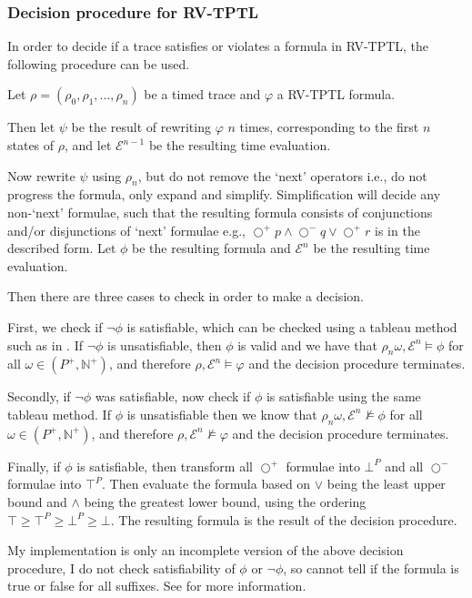 \documentclass[a4paper]{article}
\newcommand{\sn}{\bigcirc^+}
\newcommand{\wn}{\bigcirc^-}
\newcommand{\eval}{\mathcal{E}}
\begin{document}
\subsubsection{Decision procedure for RV-TPTL}
In order to decide if a trace satisfies or violates a formula in RV-TPTL, the following procedure can be used.

\begin{desc}[RV-TPTL]\label{decision}
  Let $\rho=(\rho_0,\rho_1,\dots,\rho_n)$ be a timed trace and $\varphi$ a RV-TPTL formula.

  Then let $\psi$ be the result of rewriting $\varphi$ $n$ times, corresponding to the first $n$ states of $\rho$, and let $\eval^{n-1}$ be the resulting time evaluation.

  Now rewrite $\psi$ using $\rho_n$, but do not remove the `next' operators i.e., do not progress the formula, only expand and simplify.
  Simplification will decide any non-`next' formulae, such that the resulting formula consists of conjunctions and/or disjunctions of `next' formulae e.g., $\sn p \land \wn q \lor \sn r$ is in the described form. Let $\phi$ be the resulting formula and $\eval^n$ be the resulting time evaluation.

  Then there are three cases to check in order to make a decision.

  First, we check if $\neg\phi$ is satisfiable, which can be checked using a tableau method such as in \textcite{alur1994really}. If $\neg\phi$ is unsatisfiable, then $\phi$ is valid and we have that $\rho_n\omega, \eval^n \vDash \phi$ for all $\omega\in (P^+,\mathbb{N}^+)$, and therefore $\rho,\eval^n \vDash \varphi$ and the decision procedure terminates.

  Secondly, if $\neg\phi$ was satisfiable, now check if $\phi$ is satisfiable using the same tableau method. If $\phi$ is unsatisfiable then we know that $\rho_n\omega, \eval^n \nvDash \phi$ for all $\omega\in (P^+,\mathbb{N}^+)$, and therefore $\rho,\eval^n \nvDash \varphi$ and the decision procedure terminates.

  Finally, if $\phi$ is satisfiable, then transform all $\sn$ formulae into $\bot^P$ and all $\wn$ formulae into $\top^P$. Then evaluate the formula based on $\lor$ being the least upper bound and $\land$ being the greatest lower bound, using the ordering $\top \geq \top^P \geq \bot^P \geq \bot$. The resulting formula is the result of the decision procedure.
\end{desc}

My implementation is only an incomplete version of the above decision procedure, I do not check satisfiability of $\phi$ or $\neg\phi$, so cannot tell if the formula is true or false for all suffixes. See  for more information.
\end{document}
